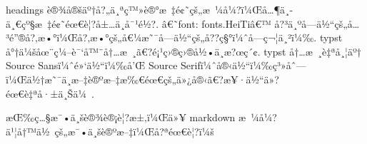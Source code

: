 \begin{Shaded}
\begin{Highlighting}[]
\NormalTok{    )}
\NormalTok{    align(center)[}
\NormalTok{    ]}
\NormalTok{  \}}

\NormalTok{      )}
\NormalTok{  \}}

\NormalTok{      )}
\NormalTok{  \}}

\end{Highlighting}
\end{Shaded}

headings
è®¾å®šäº†å?„ä¸ªç™»è®°æ~‡é¢˜çš„æ~¼å¼?ï¼Œå\ldots¶ä¸­ä¸€çº§æ~‡é¢˜éœ€è¦?å±\ldots ä¸­å¯¹é½?.
â€˜font: fonts.HeiTiâ€™
å?³ä¸ºå­---ä½``çš„å\ldots³é''®å?‚æ•°ï¼Œå?‚æ•°çš„å€¼æ˜¯å­---ä½``çš„å??ç§°ï¼ˆå­---ç¬¦ä¸²ï¼‰.
typst å°†ä¼šåœ¨ç¼--è¯`å™¨å†\ldots æ~¸ã€?é¡¹ç›®ç›®å½•ä¸­æ?œç´¢. typst
å†\ldots æ~¸è‡ªå¸¦äº† Source Sansï¼ˆé»`ä½``ï¼‰å'Œ Source
Serifï¼ˆå®‹ä½``ï¼‰ç³»åˆ---ï¼Œä½†æ˜¯ä¸­æ--‡è®ºæ--‡æ‰€éœ€çš„ä»¿å®‹ã€?æ¥·ä½``ä»?éœ€è‡ªå·±ä¸Šä¼~.

æŒ‰ç\ldots§æ¯•ä¸šè®¾è®¡è¦?æ±‚ï¼Œä»¥ markdown
æ~¼å¼?ä¹¦å†™ä½~çš„æ¯•ä¸šè®ºæ--‡ï¼Œå?ªéœ€è¦?ï¼š

